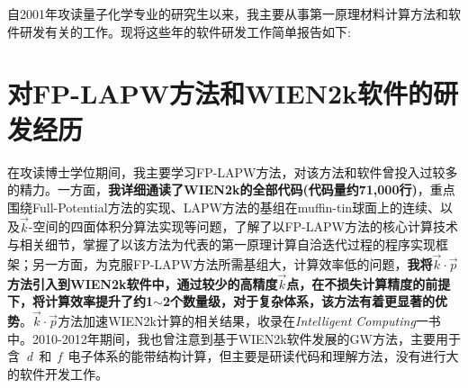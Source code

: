 \documentclass{article}      %
\newcommand{\upcite}[1]{\hspace{0ex}\textsuperscript{\cite{#1}}} %
\begin{document}


自2001年攻读量子化学专业的研究生以来，我主要从事第一原理材料计算方法和软件研发有关的工作。现将这些年的软件研发工作简单报告如下:~
\section{对{\rm FP-LAPW}方法和{\rm WIEN2k}软件的研发经历}
在攻读博士学位期间，我主要学习\textrm{FP-LAPW}方法，对该方法和软件曾投入过较多的精力。一方面，\textbf{我详细通读了\textrm{WIEN2k}的全部代码(代码量约71,000行)}，重点围绕\textrm{Full-Potential}方法的实现、\textrm{LAPW}方法的基组在\textrm{muffin-tin}球面上的连续、以及$\vec k$-空间的四面体积分算法实现等问题，了解了以\textrm{FP-LAPW}方法的核心计算技术与相关细节，掌握了以该方法为代表的第一原理计算自洽迭代过程的程序实现框架；另一方面，为克服\textrm{FP-LAPW}方法所需基组大，计算效率低的问题，\textbf{我将$\vec k\cdot\vec p$方法引入到\textrm{WIEN2k}软件中，通过较少的高精度$\vec k$点，在不损失计算精度的前提下，将计算效率提升了约1$\sim$2个数量级，对于复杂体系，该方法有着更显著的优势}。$\vec k\cdot\vec p$方法加速\textrm{WIEN2k}计算的相关结果，收录在\textit{Intelligent Computing}一书中\upcite{kp-method}。2010-2012年期间，我也曾注意到基于\textrm{WIEN2k}软件发展的\textrm{GW}方法，主要用于含~\textit{d}~和~\textit{f}~电子体系的能带结构计算，但主要是研读代码和理解方法，没有进行大的软件开发工作。
\end{document}
